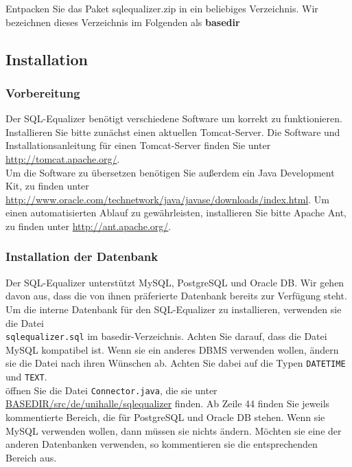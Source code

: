 \documentclass[12pt]{scrreprt}
\theoremstyle{remark}
\begin{document}
Entpacken Sie das Paket sqlequalizer.zip in ein beliebiges Verzeichnis. Wir bezeichnen dieses Verzeichnis im Folgenden als \textbf{basedir}\\

\subsection{Installation}

\subsubsection{Vorbereitung}

Der SQL-Equalizer benötigt verschiedene Software um korrekt zu funktionieren. Installieren Sie bitte zunächst einen aktuellen Tomcat-Server. Die Software und Installationsanleitung für einen Tomcat-Server finden Sie unter \url{http://tomcat.apache.org/}.\\

Um die Software zu übersetzen benötigen Sie außerdem ein Java Development Kit, zu finden unter \url{http://www.oracle.com/technetwork/java/javase/downloads/index.html}. Um einen automatisierten Ablauf zu gewährleisten, installieren Sie bitte Apache Ant, zu finden unter \url{http://ant.apache.org/}.\\

\subsubsection{Installation der Datenbank}

Der SQL-Equalizer unterstützt MySQL, PostgreSQL und Oracle DB. Wir gehen davon aus, dass die von ihnen präferierte Datenbank bereits zur Verfügung steht.\\

Um die interne Datenbank für den SQL-Equalizer zu installieren, verwenden sie die Datei\\\verb|sqlequalizer.sql| im basedir-Verzeichnis. Achten Sie darauf, dass die Datei MySQL kompatibel ist. Wenn sie ein anderes DBMS verwenden wollen, ändern sie die Datei nach ihren Wünschen ab. Achten Sie dabei auf die Typen \verb|DATETIME| und \verb|TEXT|.\\

öffnen Sie die Datei \verb|Connector.java|, die sie unter \url{BASEDIR/src/de/unihalle/sqlequalizer} finden. Ab Zeile 44 finden Sie jeweils kommentierte Bereich, die für PostgreSQL und Oracle DB stehen. Wenn sie MySQL verwenden wollen, dann müssen sie nichts ändern. Möchten sie eine der anderen Datenbanken verwenden, so kommentieren sie die entsprechenden Bereich aus.\\
\end{document}
